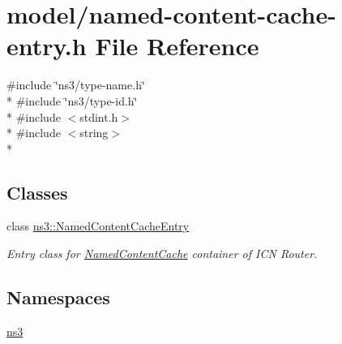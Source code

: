 \hypertarget{model_2named-content-cache-entry_8h}{\section{model/named-\/content-\/cache-\/entry.h File Reference}
\label{model_2named-content-cache-entry_8h}
}
{\ttfamily \#include \char`\"{}ns3/type-\/name.\-h\char`\"{}}\\*
{\ttfamily \#include \char`\"{}ns3/type-\/id.\-h\char`\"{}}\\*
{\ttfamily \#include $<$stdint.\-h$>$}\\*
{\ttfamily \#include $<$string$>$}\\*
\subsection*{Classes}
\begin{DoxyCompactItemize}
\item 
class \hyperlink{classns3_1_1NamedContentCacheEntry}{ns3\-::\-Named\-Content\-Cache\-Entry}
\begin{DoxyCompactList}\small\item\em Entry class for \hyperlink{classns3_1_1NamedContentCache}{Named\-Content\-Cache} container of I\-C\-N Router. \end{DoxyCompactList}\end{DoxyCompactItemize}
\subsection*{Namespaces}
\begin{DoxyCompactItemize}
\item 
\hyperlink{namespacens3}{ns3}
\end{DoxyCompactItemize}
